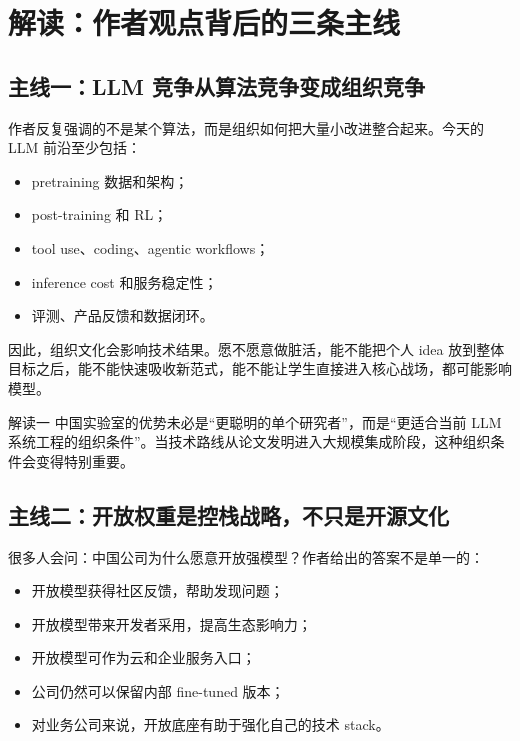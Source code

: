 \section{解读：作者观点背后的三条主线}

\subsection{主线一：LLM 竞争从算法竞争变成组织竞争}

作者反复强调的不是某个算法，而是组织如何把大量小改进整合起来。今天的 LLM 前沿至少包括：

\begin{itemize}[leftmargin=1.5em]
    \item pretraining 数据和架构；
    \item post-training 和 RL；
    \item tool use、coding、agentic workflows；
    \item inference cost 和服务稳定性；
    \item 评测、产品反馈和数据闭环。
\end{itemize}

因此，组织文化会影响技术结果。愿不愿意做脏活，能不能把个人 idea 放到整体目标之后，能不能快速吸收新范式，能不能让学生直接进入核心战场，都可能影响模型。

\begin{importantbox}{解读一}
中国实验室的优势未必是``更聪明的单个研究者''，而是``更适合当前 LLM 系统工程的组织条件''。当技术路线从论文发明进入大规模集成阶段，这种组织条件会变得特别重要。
\end{importantbox}

\subsection{主线二：开放权重是控栈战略，不只是开源文化}

很多人会问：中国公司为什么愿意开放强模型？作者给出的答案不是单一的：

\begin{itemize}[leftmargin=1.5em]
    \item 开放模型获得社区反馈，帮助发现问题；
    \item 开放模型带来开发者采用，提高生态影响力；
    \item 开放模型可作为云和企业服务入口；
    \item 公司仍然可以保留内部 fine-tuned 版本；
    \item 对业务公司来说，开放底座有助于强化自己的技术 stack。
\end{itemize}

